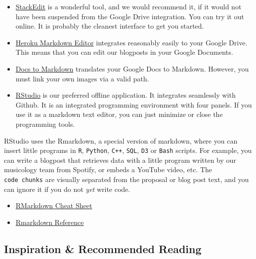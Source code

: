 \documentclass[
  fontsize=13pt,
  english,
  a4paper,
  openany, a4paper, oneside]{article}
\providecommand{\tightlist}{%
  \setlength{\itemsep}{0pt}\setlength{\parskip}{0pt}}
\begin{document}
\begin{itemize}
\item
  \href{https://stackedit.io/}{StackEdit} is a wonderful tool, and we would recommend it, if it would not have been suspended from the Google Drive integration. You can try it out online. It is probably the cleanest interface to get you started.
\item
  \href{https://thumbsdb.herokuapp.com/markdown/}{Heroku Markdown Editor} integrates reasonably easily to your Google Drive. This means that you can edit our blogposts in your Google Documents.
\item
  \href{https://gsuite.google.com/marketplace/app/docs_to_markdown/700168918607}{Docs to Markdown} translates your Google Docs to Markdown. However, you must link your own images via a valid path.
\item
  \href{https://rstudio.com/}{RStudio} is our preferred offline application. It integrates seamlessly with Github. It is an integrated programming environment with four panels. If you use it as a markdown text editor, you can just minimize or close the programming tools.
\end{itemize}

RStudio uses the Rmarkdown, a special version of markdown, where you can insert little programs in \texttt{R}, \texttt{Python}, \texttt{C++}, \texttt{SQL}, \texttt{D3} or \texttt{Bash} scripts. For example, you can write a blogpost that retrieves data with a little program written by our musicology team from Spotify, or embeds a YouTube video, etc. The \texttt{code\ chunks} are visually separated from the proposal or blog post text, and you can ignore it if you do not \emph{yet} write code.

\begin{itemize}
\tightlist
\item
  \href{https://rstudio.com/wp-content/uploads/2016/03/rmarkdown-cheatsheet-2.0.pdf?_ga=2.126386957.1623649708.1603024238-59012930.1603024238}{RMarkdown Cheat Sheet}
\item
  \href{https://rstudio.com/wp-content/uploads/2015/03/rmarkdown-reference.pdf?_ga=2.68348561.1623649708.1603024238-59012930.1603024238}{Rmarkdown Reference}
\end{itemize}

\hypertarget{inspiration}{%
\subsection{Inspiration \& Recommended Reading}\label{inspiration}}
\end{document}
